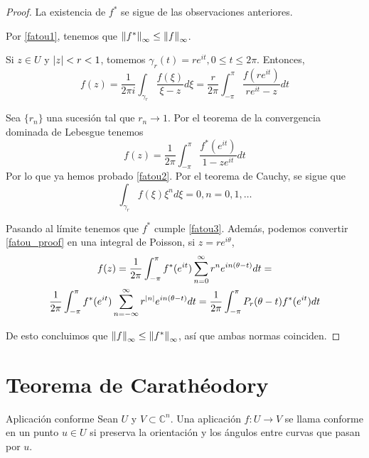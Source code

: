 \begin{proof}
    La existencia de $f^*$ se sigue de las observaciones anteriores.
    
    Por \ref{fatou1}, tenemos que $\left\lVert f^*\right\rVert_{\infty} \leq \left\lVert f\right\rVert_{\infty}$.

    Si $z \in U$ y $\left\lvert z\right\rvert < r < 1$, tomemos $\gamma_r(t) = r e^{it}, 0 \leq t \leq 2\pi$. Entonces,
    \begin{equation*}
        f(z) = \dfrac{1}{2 \pi i} \int_{\gamma_r} \dfrac{f(\xi)}{\xi - z} d\xi = 
        \dfrac{r}{2 \pi} \int_{-\pi}^{\pi} \dfrac{f(re^{it})}{re^{it} - z} dt
    \end{equation*}

    Sea $\{r_n\}$ una sucesión tal que $r_n \rightarrow 1$. Por el teorema de la convergencia dominada de Lebesgue tenemos
    \begin{equation}
        \label{fatou_proof}
        f(z) = \dfrac{1}{2 \pi} \int_{-\pi}^{\pi} \dfrac{f^* (e^{it})}{1 - ze^{it}} dt
    \end{equation}
    Por lo que ya hemos probado \ref{fatou2}. Por el teorema de Cauchy, se sigue que
    \begin{equation*}
        \int_{\gamma_r} f(\xi)\xi^n d\xi = 0, n = 0, 1, \dots
    \end{equation*}

    Pasando al límite tenemos que $f^*$ cumple \ref{fatou3}. Además, podemos convertir \ref{fatou_proof} en una integral de Poisson, si $z = re^{i \theta}$,
    \begin{multline*}
        f(z) = \dfrac{1}{2 \pi} \int_{- \pi}^{\pi} f^*(e^{it}) \sum_{n=0}^{\infty} r^n e^{in(\theta - t)} dt = \\  \dfrac{1}{2 \pi} \int_{- \pi}^{\pi} f^*(e^{it}) \sum_{n=-\infty}^{\infty} r^{\left\lvert n\right\rvert} e^{in(\theta - t)} dt =  \dfrac{1}{2 \pi} \int_{- \pi}^{\pi} P_r(\theta - t) f^*(e^{it}) dt
    \end{multline*}

    De esto concluimos que $\left\lVert f\right\rVert_{\infty} \leq \left\lVert f^*\right\rVert_{\infty}$, así que ambas normas coinciden.
\end{proof}

\section{Teorema de Carathéodory}

\begin{definition}{Aplicación conforme}
    Sean $U$ y $V \subset \mathbb{C}^n$. Una aplicación $f: U \rightarrow V$ se llama conforme en un punto $u \in U$ si preserva la orientación y los ángulos entre curvas que pasan por $u$.
\end{definition}

